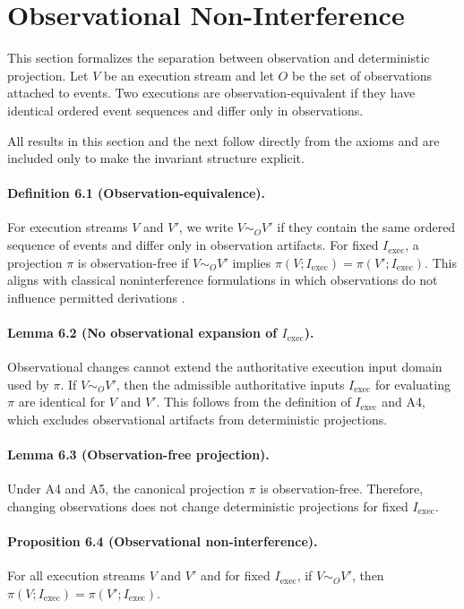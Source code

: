 \section{Observational Non-Interference}

This section formalizes the separation between observation and deterministic projection. Let $V$ be an execution stream and let $O$ be the set of observations attached to events. Two executions are observation-equivalent if they have identical ordered event sequences and differ only in observations.

All results in this section and the next follow directly from the axioms and are included only to make the invariant structure explicit.

\paragraph{Definition 6.1 (Observation-equivalence).}
For execution streams $V$ and $V'$, we write $V \sim_O V'$ if they contain the same ordered sequence of events and differ only in observation artifacts. For fixed $I_{\text{exec}}$, a projection $\pi$ is observation-free if $V \sim_O V'$ implies $\pi(V; I_{\text{exec}}) = \pi(V'; I_{\text{exec}})$. This aligns with classical noninterference formulations in which observations do not influence permitted derivations \cite{goguen1982security,rushby1992noninterference}.

\paragraph{Lemma 6.2 (No observational expansion of $I_{\text{exec}}$).}
Observational changes cannot extend the authoritative execution input domain used by $\pi$. If $V \sim_O V'$, then the admissible authoritative inputs $I_{\text{exec}}$ for evaluating $\pi$ are identical for $V$ and $V'$. This follows from the definition of $I_{\text{exec}}$ and A4, which excludes observational artifacts from deterministic projections.

\paragraph{Lemma 6.3 (Observation-free projection).}
Under A4 and A5, the canonical projection $\pi$ is observation-free. Therefore, changing observations does not change deterministic projections for fixed $I_{\text{exec}}$.

\paragraph{Proposition 6.4 (Observational non-interference).}
For all execution streams $V$ and $V'$ and for fixed $I_{\text{exec}}$, if $V \sim_O V'$, then $\pi(V; I_{\text{exec}}) = \pi(V'; I_{\text{exec}})$.

